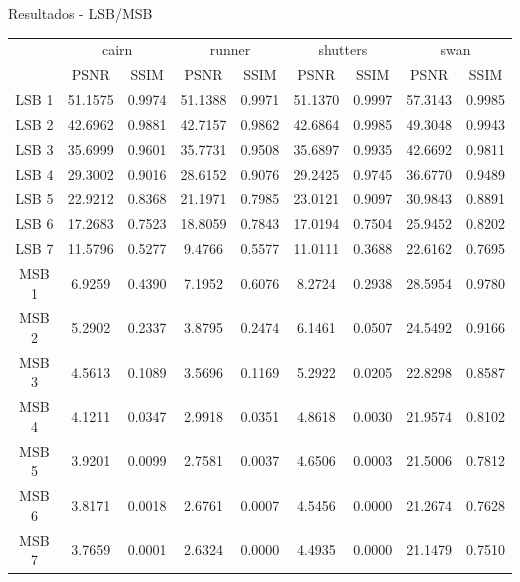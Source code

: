 \documentclass[]{beamer}
\begin{document}
\begin{frame}{Resultados - LSB/MSB}
\begin{table}[h!]
\centering
\begingroup
\tiny
\begin{tabular}{ccccccccc}
\hline
& \multicolumn{2}{c}{cairn} & \multicolumn{2}{c}{runner} & \multicolumn{2}{c}{shutters} & \multicolumn{2}{c}{swan} \\
& PSNR & SSIM & PSNR & SSIM & PSNR & SSIM & PSNR & SSIM \\
\hline
LSB 1 & 51.1575 & 0.9974 & 51.1388 & 0.9971 & 51.1370 & 0.9997 & 57.3143 & 0.9985 \\
LSB 2 & 42.6962 & 0.9881 & 42.7157 & 0.9862 & 42.6864 & 0.9985 & 49.3048 & 0.9943 \\
LSB 3 & 35.6999 & 0.9601 & 35.7731 & 0.9508 & 35.6897 & 0.9935 & 42.6692 & 0.9811 \\
LSB 4 & 29.3002 & 0.9016 & 28.6152 & 0.9076 & 29.2425 & 0.9745 & 36.6770 & 0.9489 \\
LSB 5 & 22.9212 & 0.8368 & 21.1971 & 0.7985 & 23.0121 & 0.9097 & 30.9843 & 0.8891 \\
LSB 6 & 17.2683 & 0.7523 & 18.8059 & 0.7843 & 17.0194 & 0.7504 & 25.9452 & 0.8202 \\
LSB 7 & 11.5796 & 0.5277 & 9.4766 & 0.5577 & 11.0111 & 0.3688 & 22.6162 & 0.7695 \\
\hline
MSB 1 & 6.9259 & 0.4390 & 7.1952 & 0.6076 & 8.2724 & 0.2938 & 28.5954 & 0.9780 \\
MSB 2 & 5.2902 & 0.2337 & 3.8795 & 0.2474 & 6.1461 & 0.0507 & 24.5492 & 0.9166 \\
MSB 3 & 4.5613 & 0.1089 & 3.5696 & 0.1169 & 5.2922 & 0.0205 & 22.8298 & 0.8587 \\
MSB 4 & 4.1211 & 0.0347 & 2.9918 & 0.0351 & 4.8618 & 0.0030 & 21.9574 & 0.8102 \\
MSB 5 & 3.9201 & 0.0099 & 2.7581 & 0.0037 & 4.6506 & 0.0003 & 21.5006 & 0.7812 \\
MSB 6 & 3.8171 & 0.0018 & 2.6761 & 0.0007 & 4.5456 & 0.0000 & 21.2674 & 0.7628 \\
MSB 7 & 3.7659 & 0.0001 & 2.6324 & 0.0000 & 4.4935 & 0.0000 & 21.1479 & 0.7510 \\
\hline
\end{tabular}
\endgroup
\end{table} 
\end{frame}
\end{document}
